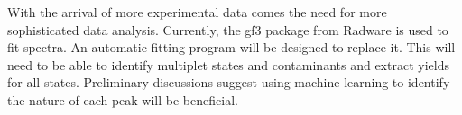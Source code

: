 With the arrival of more experimental data comes the need for more sophisticated data analysis. Currently, the gf3 package from Radware is used to fit spectra. An automatic fitting program will be designed to replace it. This will need to be able to identify multiplet states and contaminants and extract yields for all states. Preliminary discussions suggest using machine learning to identify the nature of each peak will be beneficial.

